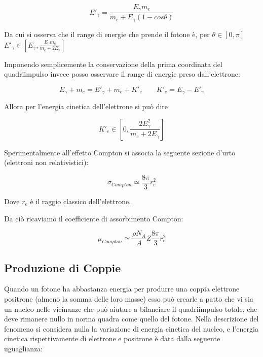 \begin{equation}
E'_{\gamma}=\frac{E_{\gamma}m_e}{m_e+E_{\gamma}(1-cos\theta)}
\end{equation}

Da cui si osserva che il range di energie che prende il fotone è, per $\theta \in [0,\pi]$ $E'_{\gamma} \in [E_{\gamma},\frac{E_{\gamma}m_e}{m_e+2E_{\gamma}}]$

Imponendo semplicemente la conservazione della prima coordinata del quadriimpulso invece posso osservare il range di energie preso dall'elettrone:

\begin{equation}
E_{\gamma}+m_e=E'_{\gamma}+m_e+K'_e \qquad K'_e=E_{\gamma}-E'_{\gamma}
\end{equation}

Allora per l'energia cinetica dell'elettrone si può dire

\begin{equation}
K'_e \in [0, \frac{2E_{\gamma}^2}{m_e+2E_{\gamma}}]
\end{equation}

Sperimentalmente all'effetto Compton si associa la seguente sezione d'urto (elettroni non relativistici):

\begin{equation}
\sigma_{Compton}\simeq\frac{8\pi}{3}r_{e}^2
\end{equation}

Dove $r_{e}$ è il raggio classico dell'elettrone.

Da ciò ricaviamo il coefficiente di assorbimento Compton:

\begin{equation}
\mu_{Compton}\simeq\frac{\rho N_{A}}{A}Z\frac{8\pi}{3}r_{e}^2
\end{equation}

\subsection{Produzione di Coppie}

Quando un fotone ha abbastanza energia per produrre una coppia elettrone positrone (almeno la somma delle loro masse) esso può crearle a patto che vi sia un nucleo nelle vicinanze che può aiutare a bilanciare il quadriimpulso totale, che deve rimanere nullo in norma quadra come quello del fotone. 
Nella descrizione del fenomeno si considera nulla la variazione di energia cinetica del nucleo, e l'energia cinetica rispettivamente di elettrone e positrone è data dalla seguente uguaglianza:

